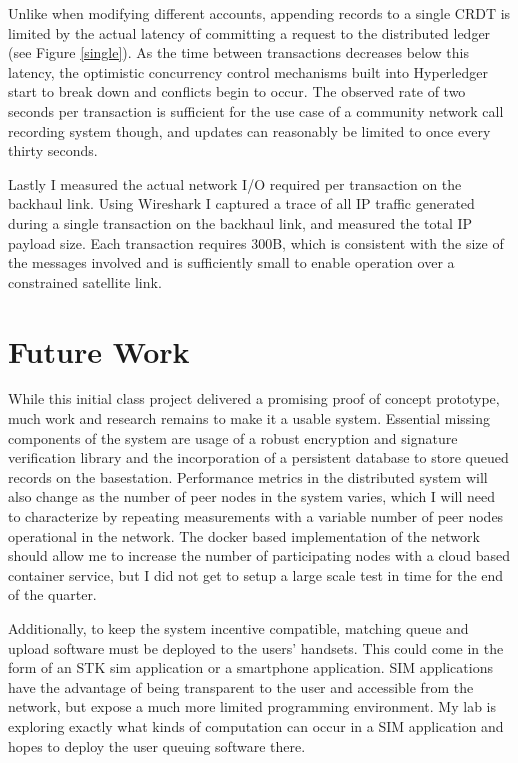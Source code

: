 Unlike when modifying different accounts, appending records to a
single CRDT is limited by the actual latency of committing a request
to the distributed ledger (see Figure \ref{single}). As the time
between transactions decreases below this latency, the optimistic
concurrency control mechanisms built into Hyperledger start to break
down and conflicts begin to occur. The observed rate of two seconds
per transaction is sufficient for the use case of a community network
call recording system though, and updates can reasonably be limited to
once every thirty seconds.

Lastly I measured the actual network I/O required per transaction on
the backhaul link. Using Wireshark I captured a trace of all IP
traffic generated during a single transaction on the backhaul link,
and measured the total IP payload size. Each transaction requires
300B, which is consistent with the size of the messages involved and
is sufficiently small to enable operation over a constrained satellite
link.

\section{Future Work}

While this initial class project delivered a promising proof of
concept prototype, much work and research remains to make it a usable
system. Essential missing components of the system are usage of a
robust encryption and signature verification library and the
incorporation of a persistent database to store queued records on the
basestation. Performance metrics in the distributed system will also
change as the number of peer nodes in the system varies, which I will
need to characterize by repeating measurements with a variable number
of peer nodes operational in the network. The docker based
implementation of the network should allow me to increase the number
of participating nodes with a cloud based container service, but I did
not get to setup a large scale test in time for the end of the
quarter.

Additionally, to keep the system incentive compatible, matching queue
and upload software must be deployed to the users' handsets. This
could come in the form of an STK sim application or a smartphone
application. SIM applications have the advantage of being transparent
to the user and accessible from the network, but expose a much more
limited programming environment. My lab is exploring exactly what
kinds of computation can occur in a SIM application and hopes to
deploy the user queuing software there.

